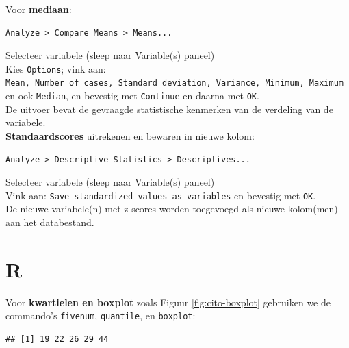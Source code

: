 \documentclass[
]{book}
\newenvironment{Shaded}{\begin{snugshade}}{\end{snugshade}}
\newcommand{\CommentTok}[1]{\textcolor[rgb]{0.56,0.35,0.01}{\textit{#1}}}
\newcommand{\KeywordTok}[1]{\textcolor[rgb]{0.13,0.29,0.53}{\textbf{#1}}}
\newcommand{\NormalTok}[1]{#1}
\newcommand{\OperatorTok}[1]{\textcolor[rgb]{0.81,0.36,0.00}{\textbf{#1}}}
\newcommand{\StringTok}[1]{\textcolor[rgb]{0.31,0.60,0.02}{#1}}
\begin{document}
Voor \textbf{mediaan}:\\

\begin{verbatim}
Analyze > Compare Means > Means...
\end{verbatim}

Selecteer variabele (sleep naar Variable(s) paneel)\\
Kies \texttt{Options}; vink aan:
\texttt{Mean,\ Number\ of\ cases,\ Standard\ deviation,\ Variance,\ Minimum,\ Maximum}
en ook \texttt{Median}, en bevestig met \texttt{Continue} en daarna met \texttt{OK}.\\
De uitvoer bevat de gevraagde statistische kenmerken van de verdeling
van de variabele.\\

\textbf{Standaardscores} uitrekenen en bewaren in nieuwe kolom:\\

\begin{verbatim}
Analyze > Descriptive Statistics > Descriptives...
\end{verbatim}

Selecteer variabele (sleep naar Variable(s) paneel)\\
Vink aan: \texttt{Save\ standardized\ values\ as\ variables} en bevestig met \texttt{OK}.\\
De nieuwe variabele(n) met z-scores worden toegevoegd als nieuwe
kolom(men) aan het databestand.\\

\hypertarget{r-3}{%
\section{R}\label{r-3}}

Voor \textbf{kwartielen en boxplot} zoals Figuur \ref{fig:cito-boxplot} gebruiken we de commando's \texttt{fivenum}, \texttt{quantile}, en \texttt{boxplot}:

\begin{Shaded}
\end{Shaded}

\begin{verbatim}
## [1] 19 22 26 29 44
\end{verbatim}
\end{document}
